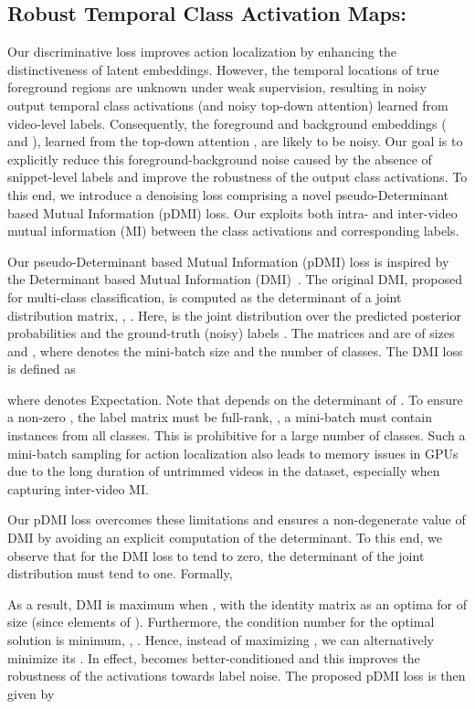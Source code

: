\documentclass[10pt,twocolumn,letterpaper]{article}
\begin{document}
\subsection{Robust Temporal Class Activation Maps: \label{sec:denoising_loss}}
Our discriminative loss  improves action localization by enhancing the distinctiveness of latent embeddings.
However, the temporal locations of true foreground regions are unknown under weak supervision, resulting in noisy output temporal class activations (and noisy top-down attention) learned from video-level labels.
Consequently, the foreground and background embeddings ( and ), learned from the top-down attention , are likely to be noisy. 
Our goal is to explicitly reduce this foreground-background noise caused by the absence of snippet-level labels and improve the robustness of the output class activations. 
To this end, we introduce a denoising loss  comprising a novel pseudo-Determinant based Mutual Information (pDMI) loss. Our  exploits both intra- and inter-video mutual information (MI) between the class activations and corresponding labels.





Our pseudo-Determinant based Mutual Information (pDMI) loss is inspired by the Determinant based Mutual Information (DMI)~\cite{dmi_neurips19}. The original DMI, proposed for multi-class classification, is computed as the determinant of a joint distribution matrix, \ie, . Here,  is the joint distribution over the predicted posterior probabilities  and the ground-truth (noisy) labels . The matrices  and  are of sizes  and , where  denotes the mini-batch size and  the number of classes. The DMI loss  is defined as

where  denotes Expectation.
Note that  depends on the determinant of . To ensure a non-zero , the label matrix  must be full-rank, \ie, a mini-batch must contain instances from all classes. This is prohibitive for a large number of classes. Such a mini-batch sampling for action localization also leads to memory issues in GPUs due to the long duration of untrimmed videos in the dataset, especially when capturing inter-video MI.

Our pDMI loss overcomes these limitations and ensures a non-degenerate value of DMI by avoiding an explicit computation of the determinant.
To this end, we observe that for the DMI loss to tend to zero, the determinant of the joint distribution  must tend to one.
Formally,

As a result, DMI is maximum when , with the identity matrix  as an optima for  of size  (since elements of ). Furthermore, the condition number  for the optimal solution  is minimum, \ie, . Hence, instead of maximizing  , we can alternatively minimize its . In effect,  becomes better-conditioned and this improves the robustness of the activations towards label noise. 
The proposed pDMI loss  is then given by
\end{document}
